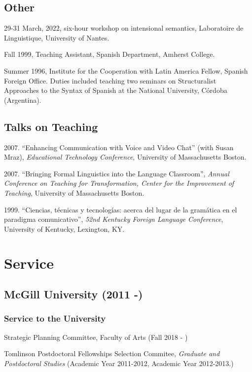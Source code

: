 \documentclass[11pt]{article}
\begin{document}
\subsection*{\textbf{Other}}

29-31 March, 2022, six-hour workshop on intensional semantics, Laboratoire de Linguistique, University of Nantes. 

Fall 1999, Teaching Assistant, Spanish Department, Amherst College.

Summer 1996,  Institute for the Cooperation with Latin America Fellow,  Spanish Foreign Office. Duties included teaching two seminars on Structuralist Approaches to the Syntax of Spanish at the National University, C\'ordoba (Argentina).


\subsection*{Talks on Teaching}


2007. ``Enhancing Communication with Voice and Video Chat'' (with Susan Mraz), \textit{Educational Technology Conference}, University of Massachusetts Boston.

2007. ``Bringing Formal Linguistics into the Language Classroom'', \textit{Annual Conference on Teaching for Transformation, Center for the Improvement of Teaching}, University of Massachusetts Boston.

1999. ``Ciencias, t\'ecnicas y tecnolog\'ias: acerca del lugar de la gram\'atica en el paradigma comunicativo'', \textit{52nd Kentucky Foreign Language Conference}, University of Kentucky, Lexington, KY.

\section*{Service}

\subsection*{McGill University (2011 -)}

\subsubsection*{Service to the University}

Strategic Planning Committee, Faculty of Arts (Fall 2018 - )

Tomlinson Postdoctoral Fellowships Selection Commitee, \textit{Graduate and
  Postdoctoral Studies} (Academic Year 2011-2012, Academic Year 2012-2013.)
\end{document}

